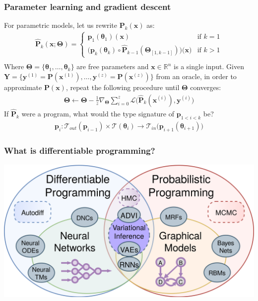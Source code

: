 \documentclass{beamer}
\begin{document}
    \begin{frame}
        \frametitle{Parameter learning and gradient descent}
        For parametric models, let us rewrite $\mathbf{P}_k(\mathbf{x})$ as:
        \begin{align*}
            \mathbf{\hat P}_k(\mathbf{x}; \mathbf{\boldsymbol\Theta}) = \begin{cases} \mathbf{p}_1(\boldsymbol\theta_1)(\mathbf{x}) &\text{if } k=1\\ \big(\mathbf{p}_k(\boldsymbol\theta_k)\circ \mathbf{\hat P}_{k-1}(\boldsymbol\Theta_{[1, k-1]})\big)\big(\mathbf{x}\big)&\text{if } k > 1 \end{cases} \\
        \end{align*}
        Where $\boldsymbol\Theta = \{\boldsymbol\theta_1, \dots, \boldsymbol\theta_k\}$ are free parameters and $\mathbf{x} \in \mathbb{R}^n$ is a single input. Given $\mathbf{Y} = \{\mathbf{y}^{(1)} = \mathbf{P}(\mathbf{x}^{(1)}), \dots, \mathbf{y}^{(z)} = \mathbf{P}(\mathbf{x}^{(z)})\}$ from an oracle, in order to approximate $\mathbf{P}(\mathbf x)$, repeat the following procedure until $\boldsymbol\Theta$ converges:
        \begin{align*}
            \boldsymbol\Theta \leftarrow \boldsymbol\Theta - \frac{1}{z}\nabla_{\boldsymbol\Theta} \sum_{i=0}^z\mathcal{L}\big(\mathbf{\hat P}_k(\mathbf{x}^{(i)}), \mathbf{y}^{(i)}\big)
        \end{align*}
        If $\mathbf{\hat P}_{k}$ were a program, what would the type signature of $\mathbf{p}_{1<i<k}$ be?
        \begin{align*}
            \mathbf{p}_i: \mathcal{T}_{out}(\mathbf{p}_{i-1}) \times \mathcal{T}(\boldsymbol\theta_{i}) \rightarrow \mathcal{T}_{in}\big(\mathbf{p}_{i+1}(\boldsymbol\theta_{i+1})\big)
        \end{align*}
    \end{frame}

    \begin{frame}
        \frametitle{What is differentiable programming?}
        \begin{center}
            \includegraphics[scale=0.07]{../figures/diff_prob_prog.png}
        \end{center}
    \end{frame}
\end{document}
